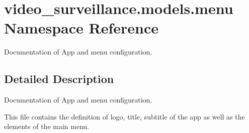 \hypertarget{namespacevideo__surveillance_1_1models_1_1menu}{}\section{video\+\_\+surveillance.\+models.\+menu Namespace Reference}
\label{namespacevideo__surveillance_1_1models_1_1menu}


Documentation of App and menu configuration.  




\subsection{Detailed Description}
Documentation of App and menu configuration. 

This file contains the definition of logo, title, subtitle of the app as well as the elements of the main menu. 